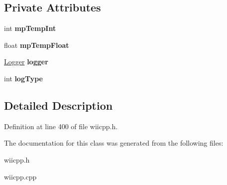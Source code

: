 \subsection*{\-Private \-Attributes}
\begin{DoxyCompactItemize}
\item 
\hypertarget{class_c_wiimote_aee9de2bf7c6e2d2933b2be46f21f4982}{int {\bfseries mp\-Temp\-Int}}\label{class_c_wiimote_aee9de2bf7c6e2d2933b2be46f21f4982}

\item 
\hypertarget{class_c_wiimote_a2617e6071bfc6712961d6b7edb79c2e5}{float {\bfseries mp\-Temp\-Float}}\label{class_c_wiimote_a2617e6071bfc6712961d6b7edb79c2e5}

\item 
\hypertarget{class_c_wiimote_a211cbf074ff990c86b441c84ad003493}{\hyperlink{class_logger}{\-Logger} {\bfseries logger}}\label{class_c_wiimote_a211cbf074ff990c86b441c84ad003493}

\item 
\hypertarget{class_c_wiimote_a9569ece9c54e7483b1f52a3a94ecc746}{int {\bfseries log\-Type}}\label{class_c_wiimote_a9569ece9c54e7483b1f52a3a94ecc746}

\end{DoxyCompactItemize}


\subsection{\-Detailed \-Description}


\-Definition at line 400 of file wiicpp.\-h.



\-The documentation for this class was generated from the following files\-:\begin{DoxyCompactItemize}
\item 
wiicpp.\-h\item 
wiicpp.\-cpp\end{DoxyCompactItemize}
